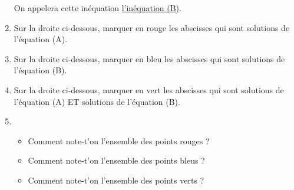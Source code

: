 \documentclass[
	classe=$2^{de}$,
	exercices=Chapitre\space 2
]{exercice}
\begin{document}
\begin{enumerate}
	      On appelera cette inéquation \uline{l'inéquation (B)}.
	\item Sur la droite ci-dessous, marquer en {\color{red}rouge} les abscisses qui sont solutions de l'équation (A).
	      \begin{center}
	      \end{center}
	\item Sur la droite ci-dessous, marquer en {\color{blue}bleu} les abscisses qui sont solutions de l'équation (B).
	      \begin{center}
	      \end{center}
	\item Sur la droite ci-dessous, marquer en {\color{green}vert} les abscisses qui sont solutions de l'équation (A) ET solutions de l'équation (B).
	      \begin{center}
	      \end{center}
	\item
	      \begin{itemize}
		      \item Comment note-t'on l'ensemble des points {\color{red}rouges} ? \correctionDots{$[-∞ ; 1]$}
		      \item  Comment note-t'on l'ensemble des points {\color{blue}bleus} ? \correctionDots{$[-2 ; +∞]$}
		      \item  Comment note-t'on l'ensemble des points {\color{green}verts} ? \correctionDots{$[-2 ; 1]$}
	      \end{itemize}
\end{enumerate}
\end{document}
